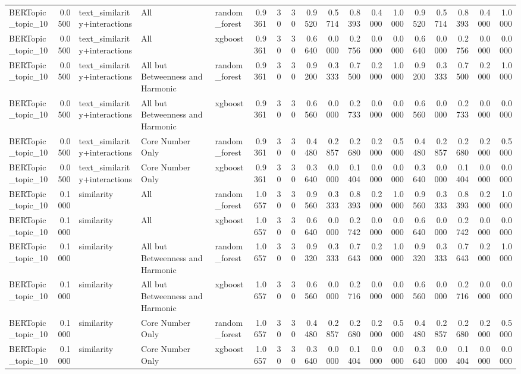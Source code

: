 \begin{tabular}{lrlllrrrrrrrrrrrrr}
BERTopic_topic_10 & 0.0500 & text_similarity+interactions & All & random_forest & 0.9361 & 30 & 30 & 0.9520 & 0.5714 & 0.8393 & 0.4000 & 1.0000 & 0.9520 & 0.5714 & 0.8393 & 0.4000 & 1.0000 \\
BERTopic_topic_10 & 0.0500 & text_similarity+interactions & All & xgboost & 0.9361 & 30 & 30 & 0.6640 & 0.0000 & 0.2756 & 0.0000 & 0.0000 & 0.6640 & 0.0000 & 0.2756 & 0.0000 & 0.0000 \\
BERTopic_topic_10 & 0.0500 & text_similarity+interactions & All but Betweenness and Harmonic & random_forest & 0.9361 & 30 & 30 & 0.9200 & 0.3333 & 0.7500 & 0.2000 & 1.0000 & 0.9200 & 0.3333 & 0.7500 & 0.2000 & 1.0000 \\
BERTopic_topic_10 & 0.0500 & text_similarity+interactions & All but Betweenness and Harmonic & xgboost & 0.9361 & 30 & 30 & 0.6560 & 0.0000 & 0.2733 & 0.0000 & 0.0000 & 0.6560 & 0.0000 & 0.2733 & 0.0000 & 0.0000 \\
BERTopic_topic_10 & 0.0500 & text_similarity+interactions & Core Number Only & random_forest & 0.9361 & 30 & 30 & 0.4480 & 0.2857 & 0.2680 & 0.2000 & 0.5000 & 0.4480 & 0.2857 & 0.2680 & 0.2000 & 0.5000 \\
BERTopic_topic_10 & 0.0500 & text_similarity+interactions & Core Number Only & xgboost & 0.9361 & 30 & 30 & 0.3640 & 0.0000 & 0.1404 & 0.0000 & 0.0000 & 0.3640 & 0.0000 & 0.1404 & 0.0000 & 0.0000 \\
BERTopic_topic_10 & 0.1000 & similarity & All & random_forest & 1.0657 & 30 & 30 & 0.9560 & 0.3333 & 0.8393 & 0.2000 & 1.0000 & 0.9560 & 0.3333 & 0.8393 & 0.2000 & 1.0000 \\
BERTopic_topic_10 & 0.1000 & similarity & All & xgboost & 1.0657 & 30 & 30 & 0.6640 & 0.0000 & 0.2742 & 0.0000 & 0.0000 & 0.6640 & 0.0000 & 0.2742 & 0.0000 & 0.0000 \\
BERTopic_topic_10 & 0.1000 & similarity & All but Betweenness and Harmonic & random_forest & 1.0657 & 30 & 30 & 0.9320 & 0.3333 & 0.7643 & 0.2000 & 1.0000 & 0.9320 & 0.3333 & 0.7643 & 0.2000 & 1.0000 \\
BERTopic_topic_10 & 0.1000 & similarity & All but Betweenness and Harmonic & xgboost & 1.0657 & 30 & 30 & 0.6560 & 0.0000 & 0.2716 & 0.0000 & 0.0000 & 0.6560 & 0.0000 & 0.2716 & 0.0000 & 0.0000 \\
BERTopic_topic_10 & 0.1000 & similarity & Core Number Only & random_forest & 1.0657 & 30 & 30 & 0.4480 & 0.2857 & 0.2680 & 0.2000 & 0.5000 & 0.4480 & 0.2857 & 0.2680 & 0.2000 & 0.5000 \\
BERTopic_topic_10 & 0.1000 & similarity & Core Number Only & xgboost & 1.0657 & 30 & 30 & 0.3640 & 0.0000 & 0.1404 & 0.0000 & 0.0000 & 0.3640 & 0.0000 & 0.1404 & 0.0000 & 0.0000 \\

\end{tabular}
